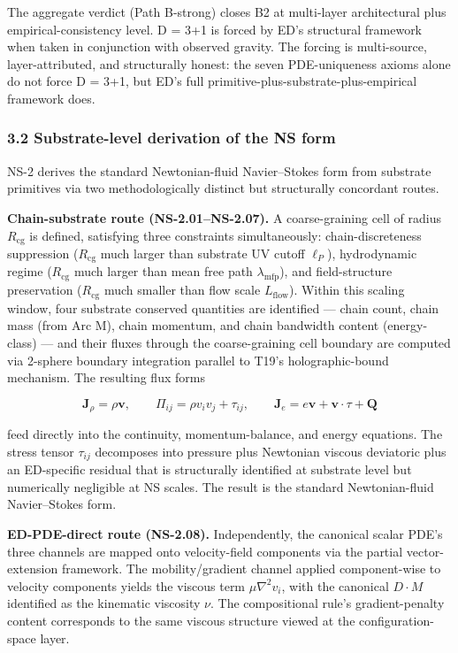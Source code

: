\documentclass[
]{article}
\begin{document}
The aggregate verdict (Path B-strong) closes B2 at multi-layer
architectural plus empirical-consistency level. D = 3+1 is forced by
ED's structural framework when taken in conjunction with observed
gravity. The forcing is multi-source, layer-attributed, and structurally
honest: the seven PDE-uniqueness axioms alone do not force D = 3+1, but
ED's full primitive-plus-substrate-plus-empirical framework does.

\subsubsection{3.2 Substrate-level derivation of the NS
form}\label{substrate-level-derivation-of-the-ns-form}

NS-2 derives the standard Newtonian-fluid Navier--Stokes form from
substrate primitives via two methodologically distinct but structurally
concordant routes.

\textbf{Chain-substrate route (NS-2.01--NS-2.07).} A coarse-graining
cell of radius \(R_\mathrm{cg}\) is defined, satisfying three
constraints simultaneously: chain-discreteness suppression
(\(R_\mathrm{cg}\) much larger than substrate UV cutoff \(\ell_P\)),
hydrodynamic regime (\(R_\mathrm{cg}\) much larger than mean free path
\(\lambda_\mathrm{mfp}\)), and field-structure preservation
(\(R_\mathrm{cg}\) much smaller than flow scale \(L_\mathrm{flow}\)).
Within this scaling window, four substrate conserved quantities are
identified --- chain count, chain mass (from Arc M), chain momentum, and
chain bandwidth content (energy-class) --- and their fluxes through the
coarse-graining cell boundary are computed via 2-sphere boundary
integration parallel to T19's holographic-bound mechanism. The resulting
flux forms

\[\mathbf{J}_\rho = \rho \mathbf{v}, \qquad \Pi_{ij} = \rho v_i v_j + \tau_{ij}, \qquad \mathbf{J}_e = e \mathbf{v} + \mathbf{v} \cdot \tau + \mathbf{Q}\]

feed directly into the continuity, momentum-balance, and energy
equations. The stress tensor \(\tau_{ij}\) decomposes into pressure plus
Newtonian viscous deviatoric plus an ED-specific residual that is
structurally identified at substrate level but numerically negligible at
NS scales. The result is the standard Newtonian-fluid Navier--Stokes
form.

\textbf{ED-PDE-direct route (NS-2.08).} Independently, the canonical
scalar PDE's three channels are mapped onto velocity-field components
via the partial vector-extension framework. The mobility/gradient
channel applied component-wise to velocity components yields the viscous
term \(\mu \nabla^2 v_i\), with the canonical \(D \cdot M\) identified
as the kinematic viscosity \(\nu\). The compositional rule's
gradient-penalty content corresponds to the same viscous structure
viewed at the configuration-space layer.
\end{document}

